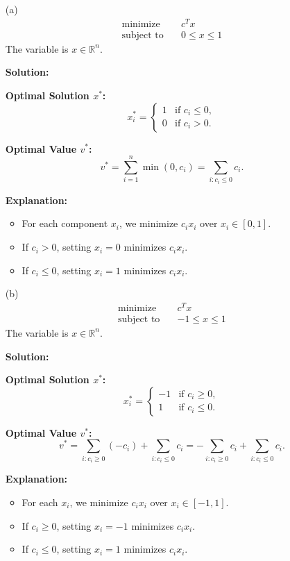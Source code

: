 \documentclass{article}
\begin{document}
\begin{enumerate}
    \item[(a)] 
    \begin{align*}
        \text{minimize} \quad & c^T x \\
        \text{subject to} \quad & 0 \leq x \leq 1
    \end{align*}
    The variable is $x \in \mathbb{R}^n$.

    \textbf{Solution:}

    \textbf{Optimal Solution $x^*$:}
    \[
    x_i^* = \begin{cases}
    1 & \text{if } c_i \leq 0, \\
    0 & \text{if } c_i > 0.
    \end{cases}
    \]

    \textbf{Optimal Value $v^*$:}
    \[
    v^* = \sum_{i=1}^{n} \min(0, c_i) = \sum_{i: c_i \leq 0} c_i.
    \]

    \textbf{Explanation:}
    \begin{itemize}
    \item For each component $x_i$, we minimize $c_i x_i$ over $x_i \in [0,1]$.
    \item If $c_i > 0$, setting $x_i = 0$ minimizes $c_i x_i$.
    \item If $c_i \leq 0$, setting $x_i = 1$ minimizes $c_i x_i$.
    \end{itemize}

    \item[(b)]
    \begin{align*}
        \text{minimize} \quad & c^T x \\
        \text{subject to} \quad & -1 \leq x \leq 1
    \end{align*}
    The variable is $x \in \mathbb{R}^n$.

    \textbf{Solution:}

    \textbf{Optimal Solution $x^*$:}
    \[
    x_i^* = \begin{cases}
    -1 & \text{if } c_i \geq 0, \\
    1 & \text{if } c_i \leq 0.
    \end{cases}
    \]

    \textbf{Optimal Value $v^*$:}
    \[
    v^* = \sum_{i: c_i \geq 0} (-c_i) + \sum_{i: c_i \leq 0} c_i = -\sum_{i: c_i \geq 0} c_i + \sum_{i: c_i \leq 0} c_i.
    \]

    \textbf{Explanation:}
    \begin{itemize}
    \item For each $x_i$, we minimize $c_i x_i$ over $x_i \in [-1,1]$.
    \item If $c_i \geq 0$, setting $x_i = -1$ minimizes $c_i x_i$.
    \item If $c_i \leq 0$, setting $x_i = 1$ minimizes $c_i x_i$.
    \end{itemize}


\end{enumerate}
\end{document}
